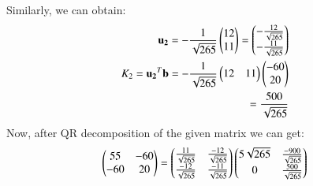 \documentclass[journal,12pt,twocolumn]{IEEEtran}
\renewcommand\thesection{\arabic{section}}
\begin{document}
Similarly, we can obtain:
\begin{align}
\mathbf{u_2}= -\frac{1}{\sqrt{265}}\begin{pmatrix}12\\11\end{pmatrix}=\begin{pmatrix}-\frac{12}{\sqrt{265}}\\-\frac{11}{\sqrt{265}}\end{pmatrix}\\
K_2 = \mathbf{u_2}^T \mathbf{b}= -\frac{1}{\sqrt{265}}\begin{pmatrix}12 & 11\end{pmatrix}\begin{pmatrix}-60\\20\end{pmatrix} \\
= \frac{500}{\sqrt{265}}
\end{align}
Now, after QR decomposition of the given matrix we can get:
\begin{align}
\begin{pmatrix}55 & -60\\-60 & 20\end{pmatrix} = \begin{pmatrix}\frac{11}{\sqrt{265}} & \frac{-12}{\sqrt{265}}\\\frac{-12}{\sqrt{265}} & \frac{-11}{\sqrt{265}}\end{pmatrix} \begin{pmatrix}5\sqrt{265} & \frac{-900}{\sqrt{265}}\\0 & \frac{500}{\sqrt{265}}\end{pmatrix}
\end{align}

\end{document}
